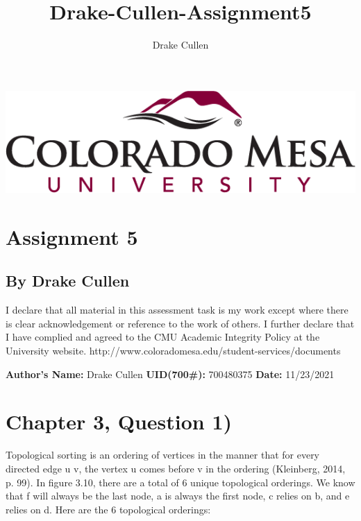\documentclass[11pt]{article}
\title{Drake-Cullen-Assignment5}
\author{Drake Cullen}
\begin{document}
\begin{minipage}{\linewidth}%
\centering
\includegraphics[keepaspectratio=true,scale=0.35]{CMU.png}
\end{minipage}
\section*{ \centering Assignment 5}
\subsection*{ \centering By Drake Cullen} 

\vspace{5mm}
 
I declare that all material in this assessment task is my work except where there is clear acknowledgement or reference to the work of others. I further declare that I have complied and agreed to the CMU Academic Integrity Policy at the University website. http://www.coloradomesa.edu/student-services/documents
\begin{center}
\textbf{Author’s Name:} Drake Cullen 
\textbf{UID(700\#):} 700480375
\textbf{ Date:} 11/23/2021
\end{center} 

\section{Chapter 3, Question 1)}
Topological sorting is an ordering of vertices in the manner that  for every directed edge u v, the vertex u comes before v in the ordering (Kleinberg, 2014, p. 99). In figure 3.10, there are a total of 6 unique topological orderings. We know that f will always be the last node, a is always the first node, c relies on b, and e relies on d. Here are the 6 topological orderings:
\end{document}
